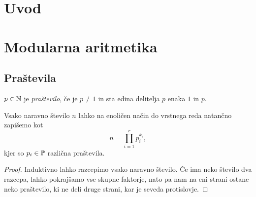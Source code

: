 \documentclass[12pt, a4paper]{article}
\begin{document}
\renewcommand{\headheight}{20pt}

\maketitle

\newpage

\tableofcontents

\newpage

\section*{Uvod}

%
%

\newpage

\section{Modularna aritmetika}

\subsection{Praštevila}

\begin{okvir}
\begin{definicija}
$p\in\N$ je \emph{praštevilo}, če je $p\ne 1$ in sta edina delitelja $p$ enaka $1$ in $p$.
\end{definicija}
\end{okvir}

\begin{izrek}
Vsako naravno število $n$ lahko na enoličen način do vrstnega reda natančno zapišemo kot
\[
n=\prod_{i=1}^r p_{i}^{k_i},
\]
kjer so $p_i\in\P$ različna praštevila.
\end{izrek}

\begin{proof}
Induktivno lahko razcepimo vsako naravno število. Če ima neko število dva razcepa, lahko pokrajšamo vse skupne faktorje, nato pa nam na eni strani ostane neko praštevilo, ki ne deli druge strani, kar je seveda protislovje.
\end{proof}
\end{document}
